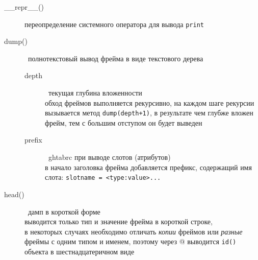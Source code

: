 \begin{description}
\item[\_\_repr\_\_()] переопределение системного оператора для вывода
\verb|print|
\item[dump()]\ полнотекстовый вывод фрейма в виде текстового дерева
\begin{description}
\item[depth]\ текущая глубина вложенности\\
обход фреймов выполняется рекурсивно, на каждом шаге рекурсии вызывается метод
\verb|dump(depth+1)|, в результате чем глубже вложен фрейм, тем с большим
отступом он будет выведен
\item[prefix]\ ghtabrc при выводе слотов (атрибутов)\\
в начало заголовка фрейма добавляется префикс, содержащий имя слота:
\verb|slotname = <type:value>...|
\end{description}
\end{description}

\smallskip
{}
 \begin{description}
\item[head()]\ дамп в короткой форме\\
выводится только тип и значение фрейма в короткой строке,\\
в некоторых случаях необходимо отличать \textit{копии} фреймов или
\textit{разные} фреймы с одним типом и именем, поэтому через @ выводится
\verb|id()| объекта в шестнадцатеричном виде
\end{description}


\secup
